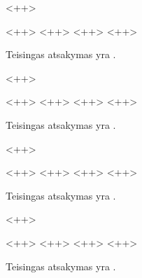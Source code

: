 \begin{tasks}
  \begin{task}
    \begin{condition}
      <++>
      \begin{enumerate}
         <++>
         <++>
         <++>
         <++>
      \end{enumerate}
    \end{condition}
    \begin{solution}
      Teisingas atsakymas yra \tref{<++>}.
    \end{solution}
  \end{task}

  \begin{task}
    \begin{condition}
      <++>
      \begin{enumerate}
         <++>
         <++>
         <++>
         <++>
      \end{enumerate}
    \end{condition}
    \begin{solution}
      Teisingas atsakymas yra \tref{<++>}.
    \end{solution}
  \end{task}

  \begin{task}
    \begin{condition}
      <++>
      \begin{enumerate}
         <++>
         <++>
         <++>
         <++>
      \end{enumerate}
    \end{condition}
    \begin{solution}
      Teisingas atsakymas yra \tref{<++>}.
    \end{solution}
  \end{task}

  \begin{task}
    \begin{condition}
      <++>
      \begin{enumerate}
         <++>
         <++>
         <++>
         <++>
      \end{enumerate}
    \end{condition}
    \begin{solution}
      Teisingas atsakymas yra \tref{<++>}.
    \end{solution}
  \end{task}


\end{tasks}
